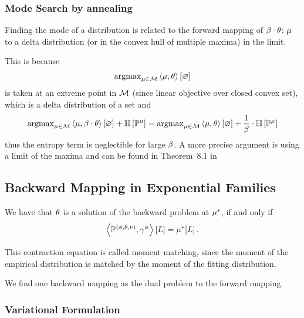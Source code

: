 \subsubsection{Mode Search by annealing}

Finding the mode of a distribution is related to the forward mapping of $\beta\cdot\theta$: $\mu$ to a delta distribution (or in the convex hull of multiple maxima) in the limit.

This is because 
\begin{align*}
	\mathrm{argmax}_{\mu\in\mathcal{M}}  \left\langle \mu,\theta\right\rangle \left[ \varnothing \right]
\end{align*}
is taken at an extreme point in $\mathcal{M}$ (since linear objective over closed convex set), which is a delta distribution of a set and
\begin{align*}
	\mathrm{argmax}_{\mu\in\mathcal{M}}  \left\langle \mu,\beta\cdot\theta\right\rangle \left[ \varnothing \right]+ \mathbb{H}\left[\mathbb{P}^{\mu}\right] 
	= 
	\mathrm{argmax}_{\mu\in\mathcal{M}}  \left\langle \mu,\theta\right\rangle \left[ \varnothing \right] + \frac{1}{\beta} \cdot \mathbb{H}\left[\mathbb{P}^{\mu}\right] 	
\end{align*}
thus the entropy term is neglectible for large $\beta$.
A more precise argument is using a limit of the maxima and can be found in Theorem~8.1 in \cite{wainwright_graphical_2008}





\subsection{Backward Mapping in Exponential Families}



	We have that $\theta$ is a solution of the backward problem at $\mu^*$, if and only if 
		\[ \left\langle \mathbb{P}^{(\phi,\theta,\nu)},\gamma^{\phi}\right\rangle \left[ L \right] = \mu^*[L] \, . \]

This contraction equation is called moment matching, since the moment of the empirical distribution is matched by the moment of the fitting distribution.

We find one backward mapping as the dual problem to the forward mapping.


\subsubsection{Variational Formulation}

